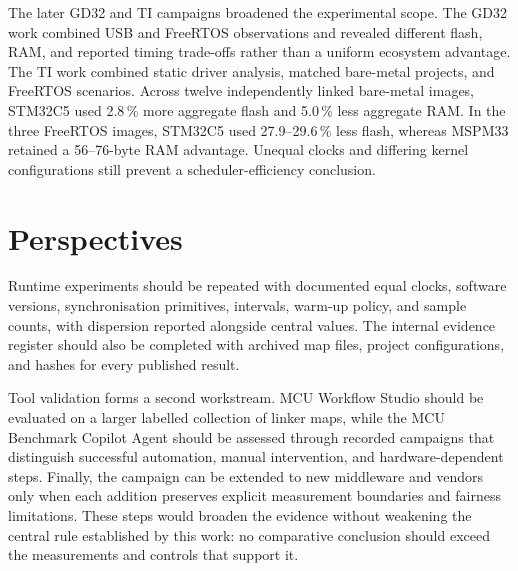 The later GD32 and TI campaigns broadened the experimental scope. The GD32 work combined
USB and FreeRTOS observations and revealed different flash, RAM, and reported timing
trade-offs rather than a uniform ecosystem advantage. The TI work combined static driver
analysis, matched bare-metal projects, and FreeRTOS scenarios. Across twelve independently
linked bare-metal images, STM32C5 used 2.8\,\% more aggregate flash and 5.0\,\% less
aggregate RAM. In the three FreeRTOS images, STM32C5 used 27.9--29.6\,\% less flash,
whereas MSPM33 retained a 56--76-byte RAM advantage. Unequal clocks and differing kernel
configurations still prevent a scheduler-efficiency conclusion.

\section*{Perspectives}

Runtime experiments should be repeated with documented equal clocks, software versions,
synchronisation primitives, intervals, warm-up policy, and sample counts, with dispersion
reported alongside central values. The internal evidence register should also be completed
with archived map files, project configurations, and hashes for every published result.

Tool validation forms a second workstream. MCU Workflow Studio should be evaluated on a
larger labelled collection of linker maps, while the MCU Benchmark Copilot Agent should be
assessed through recorded campaigns that distinguish successful automation, manual
intervention, and hardware-dependent steps. Finally, the campaign can be extended to new
middleware and vendors only when each addition preserves explicit measurement boundaries
and fairness limitations. These steps would broaden the evidence without weakening the
central rule established by this work: no comparative conclusion should exceed the
measurements and controls that support it.